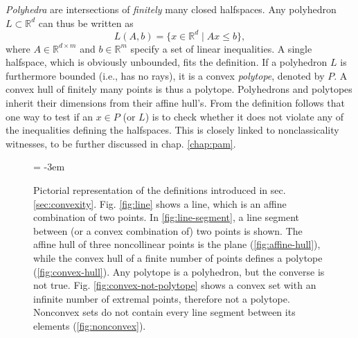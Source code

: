 		\emph{Polyhedra} are intersections of \emph{finitely} many closed halfspaces. Any polyhedron $L \subset \mathbb{R}^d$ can thus be written as
		$$
			L(A, b) = \big\{ x \in \mathbb{R}^d \mid Ax \leq b \big\} ,
		$$
		where $A \in \mathbb{R}^{d \times m}$ and $b \in \mathbb{R}^m$ specify a set of linear inequalities. A single halfspace, which is obviously unbounded, fits the definition. If a polyhedron $L$ is furthermore bounded (i.e., has no rays), it is a convex \emph{polytope}, denoted by $P$. A convex hull of finitely many points is thus a polytope. Polyhedrons and polytopes inherit their dimensions from their affine hull's. From the definition follows that one way to test if an $x \in P$ (or $L$) is to check whether it does not violate any of the inequalities defining the halfspaces. This is closely linked to nonclassicality witnesses, to be further discussed in chap. \ref{chap:pam}.
		\begin{figure*}[t!]
			\newdimen\subfigcapmargin  \subfigcapmargin  =  -3em
			\centering
			\begin{minipage}{.8\textwidth}
				\hfill
				\hfill
	
				\hfill
				\hfill
			\end{minipage}
			\caption{Pictorial representation of the definitions introduced in sec. \ref{sec:convexity}. Fig. \ref{fig:line} shows a line, which is an affine combination of two points. In \ref{fig:line-segment}, a line segment between (or a convex combination of) two points is shown. The affine hull of three noncollinear points is the plane (\ref{fig:affine-hull}), while the convex hull of a finite number of points defines a polytope (\ref{fig:convex-hull}). Any polytope is a polyhedron, but the converse is not true. Fig. \ref{fig:convex-not-polytope} shows a convex set with an infinite number of extremal points, therefore not a polytope. Nonconvex sets do not contain every line segment between its elements (\ref{fig:nonconvex}).}
		\end{figure*}


